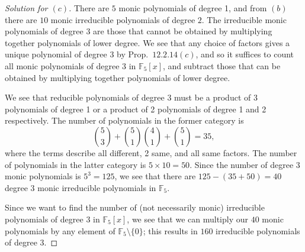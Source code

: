 \documentclass[12pt]{article}
\theoremstyle{remark}
\begin{document}
\begin{proof}[Solution for $(c)$]
  There are $5$ monic polynomials of degree 1, and from $(b)$ there are $10$ monic irreducible polynomials of degree $2$. The irreducible monic polynomials of degree $3$ are those that cannot be obtained by multiplying together polynomials of lower degree. We see that any choice of factors gives a unique polynomial of degree $3$ by Prop.~$12.2.14(c)$, and so it suffices to count all monic polynomials of degree $3$ in $\mathbb{F}_5[x]$, and subtract those that can be obtained by multiplying together polynomials of lower degree.
  \par We see that reducible polynomials of degree $3$ must be a product of 3 polynomials of degree 1 or a product of 2 polynomials of degree 1 and 2 respectively. The number of polynomials in the former category is
  \begin{equation*}
    \binom{5}{3} + \binom{5}{1}\binom{4}{1} + \binom{5}{1} = 35,
  \end{equation*}
  where the terms describe all different, 2 same, and all same factors. The number of polynomials in the latter category is $5 \times 10 = 50$. Since the number of degree $3$ monic polynomials is $5^3 = 125$, we see that there are $125 - (35 + 50) = 40$ degree $3$ monic irreducible polynomials in $\mathbb{F}_5$.
  \par Since we want to find the number of (not necessarily monic) irreducible polynomials of degree $3$ in $\mathbb{F}_5[x]$, we see that we can multiply our $40$ monic polynomials by any element of $\mathbb{F}_5 \setminus \{0\}$; this results in $160$ irreducible polynomials of degree $3$.
\end{proof}
\end{document}
